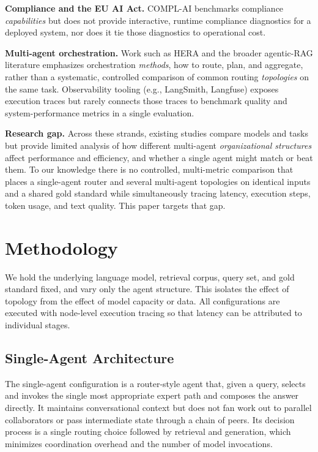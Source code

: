 \documentclass[journal,10pt,compsoc,onecolumn]{IEEEtran}
\begin{document}
\textbf{Compliance and the EU AI Act.} COMPL-AI benchmarks compliance \emph{capabilities} but does not provide interactive, runtime compliance diagnostics for a deployed system, nor does it tie those diagnostics to operational cost.

\textbf{Multi-agent orchestration.} Work such as HERA and the broader agentic-RAG literature emphasizes orchestration \emph{methods}, how to route, plan, and aggregate, rather than a systematic, controlled comparison of common routing \emph{topologies} on the same task. Observability tooling (e.g., LangSmith, Langfuse) exposes execution traces but rarely connects those traces to benchmark quality and system-performance metrics in a single evaluation.

\textbf{Research gap.} Across these strands, existing studies compare models and tasks but provide limited analysis of how different multi-agent \emph{organizational structures} affect performance and efficiency, and whether a single agent might match or beat them. To our knowledge there is no controlled, multi-metric comparison that places a single-agent router and several multi-agent topologies on identical inputs and a shared gold standard while simultaneously tracing latency, execution steps, token usage, and text quality. This paper targets that gap.

\section{Methodology}
We hold the underlying language model, retrieval corpus, query set, and gold standard fixed, and vary only the agent structure. This isolates the effect of topology from the effect of model capacity or data. All configurations are executed with node-level execution tracing so that latency can be attributed to individual stages.

\subsection{Single-Agent Architecture}
The single-agent configuration is a router-style agent that, given a query, selects and invokes the single most appropriate expert path and composes the answer directly. It maintains conversational context but does not fan work out to parallel collaborators or pass intermediate state through a chain of peers. Its decision process is a single routing choice followed by retrieval and generation, which minimizes coordination overhead and the number of model invocations.
\end{document}
